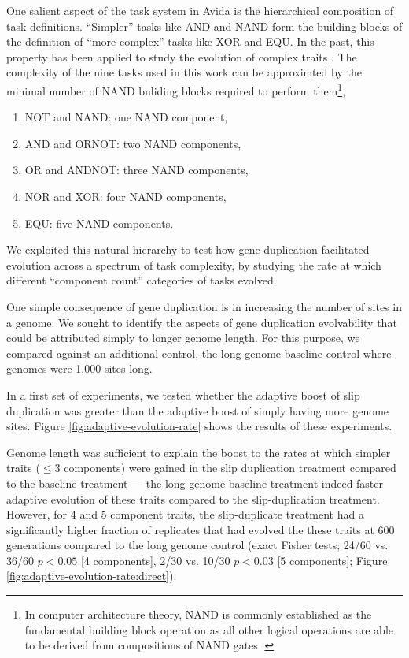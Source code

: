 One salient aspect of the task system in Avida is the hierarchical composition of task definitions.
``Simpler'' tasks like AND and NAND form the building blocks of the definition of ``more complex'' tasks like XOR and EQU.
In the past, this property has been applied to study the evolution of complex traits \citep{TODO}.
The complexity of the nine tasks used in this work can be approximted by the minimal number of NAND buliding blocks required to perform them\footnote{
In computer architecture theory, NAND is commonly established as the fundamental building block operation as all other logical operations are able to be derived from compositions of NAND gates \citep{TODO}.
},
\begin{enumerate}
\item NOT and NAND: one NAND component,
\item AND and ORNOT: two NAND components,
\item OR and ANDNOT: three NAND components,
\item NOR and XOR: four NAND components,
\item EQU: five NAND components.
\end{enumerate}
We exploited this natural hierarchy to test how gene duplication facilitated evolution across a spectrum of task complexity, by studying the rate at which different ``component count'' categories of tasks evolved.

One simple consequence of gene duplication is in increasing the number of sites in a genome.
We sought to identify the aspects of gene duplication evolvability that could be attributed simply to longer genome length.
For this purpose, we compared against an additional control, the long genome baseline control where genomes were 1,000 sites long.




In a first set of experiments, we tested whether the adaptive boost of slip duplication was greater than the adaptive boost of simply having more genome sites.
Figure \ref{fig:adaptive-evolution-rate} shows the results of these experiments.

Genome length was sufficient to explain the boost to the rates at which simpler traits ($\leq 3$ components) were gained in the slip duplication treatment compared to the baseline treatment --- the long-genome baseline treatment indeed faster adaptive evolution of these traits compared to the slip-duplication treatment.
However, for 4 and 5 component traits, the slip-duplicate treatment had a significantly higher fraction of replicates that had evolved the these traits at 600 generations compared to the long genome control (exact Fisher tests; 24/60 vs. 36/60 $p<0.05$ [4 components], 2/30 vs. 10/30 $p < 0.03$ [5 components]; Figure \ref{fig:adaptive-evolution-rate:direct}).

